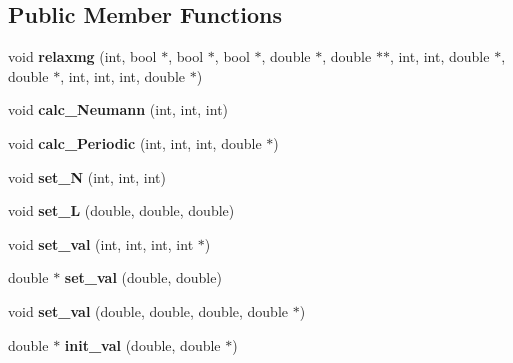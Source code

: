 \subsection*{Public Member Functions}
\begin{DoxyCompactItemize}
\item 
void {\bfseries relaxmg} (int, bool $\ast$, bool $\ast$, bool $\ast$, double $\ast$, double $\ast$$\ast$, int, int, double $\ast$, double $\ast$, int, int, int, double $\ast$)\hypertarget{classSolver_ab26d9f628828b28aab2cd6c69ca71d67}{}\label{classSolver_ab26d9f628828b28aab2cd6c69ca71d67}

\item 
void {\bfseries calc\+\_\+\+Neumann} (int, int, int)\hypertarget{classSolver_a97bde2efed1151333997fa8ada1e7d83}{}\label{classSolver_a97bde2efed1151333997fa8ada1e7d83}

\item 
void {\bfseries calc\+\_\+\+Periodic} (int, int, int, double $\ast$)\hypertarget{classSolver_a09b78b3c0d4d45a9b9c10dc8aef9fbd6}{}\label{classSolver_a09b78b3c0d4d45a9b9c10dc8aef9fbd6}

\item 
void {\bfseries set\+\_\+N} (int, int, int)\hypertarget{classSolver_a0ea8216ab12bbc285535caf8369c43f6}{}\label{classSolver_a0ea8216ab12bbc285535caf8369c43f6}

\item 
void {\bfseries set\+\_\+L} (double, double, double)\hypertarget{classSolver_aec7901ddc5b034d4d4a31b59c5024e0c}{}\label{classSolver_aec7901ddc5b034d4d4a31b59c5024e0c}

\item 
void {\bfseries set\+\_\+val} (int, int, int, int $\ast$)\hypertarget{classSolver_af703281640b14a6d6c3c10981f5996de}{}\label{classSolver_af703281640b14a6d6c3c10981f5996de}

\item 
double $\ast$ {\bfseries set\+\_\+val} (double, double)\hypertarget{classSolver_a5ceb7e78c6b9083b22747c63e96a9b22}{}\label{classSolver_a5ceb7e78c6b9083b22747c63e96a9b22}

\item 
void {\bfseries set\+\_\+val} (double, double, double, double $\ast$)\hypertarget{classSolver_ab3f0233a64efbf5fbfcd55676c95f512}{}\label{classSolver_ab3f0233a64efbf5fbfcd55676c95f512}

\item 
double $\ast$ {\bfseries init\+\_\+val} (double, double $\ast$)\hypertarget{classSolver_a1c5f9712a36b957469c886b5a25bcff1}{}\label{classSolver_a1c5f9712a36b957469c886b5a25bcff1}


\end{DoxyCompactItemize}
